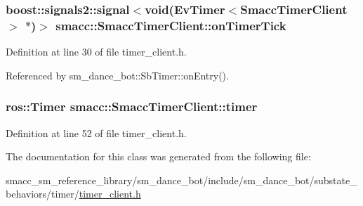 \subsubsection[{\texorpdfstring{on\+Timer\+Tick}{onTimerTick}}]{\setlength{\rightskip}{0pt plus 5cm}boost\+::signals2\+::signal$<$void({\bf Ev\+Timer}$<${\bf Smacc\+Timer\+Client}$>$ $\ast$)$>$ smacc\+::\+Smacc\+Timer\+Client\+::on\+Timer\+Tick}\hypertarget{classsmacc_1_1SmaccTimerClient_a956acd3689ff143d52066fddc884072f}{}\label{classsmacc_1_1SmaccTimerClient_a956acd3689ff143d52066fddc884072f}


Definition at line 30 of file timer\+\_\+client.\+h.



Referenced by sm\+\_\+dance\+\_\+bot\+::\+Sb\+Timer\+::on\+Entry().

\subsubsection[{\texorpdfstring{timer}{timer}}]{\setlength{\rightskip}{0pt plus 5cm}ros\+::\+Timer smacc\+::\+Smacc\+Timer\+Client\+::timer\hspace{0.3cm}{\ttfamily [protected]}}\hypertarget{classsmacc_1_1SmaccTimerClient_a52ba673d608237fdc159968c9be64547}{}\label{classsmacc_1_1SmaccTimerClient_a52ba673d608237fdc159968c9be64547}


Definition at line 52 of file timer\+\_\+client.\+h.



The documentation for this class was generated from the following file\+:\begin{DoxyCompactItemize}
\item 
smacc\+\_\+sm\+\_\+reference\+\_\+library/sm\+\_\+dance\+\_\+bot/include/sm\+\_\+dance\+\_\+bot/substate\+\_\+behaviors/timer/\hyperlink{timer__client_8h}{timer\+\_\+client.\+h}\end{DoxyCompactItemize}

